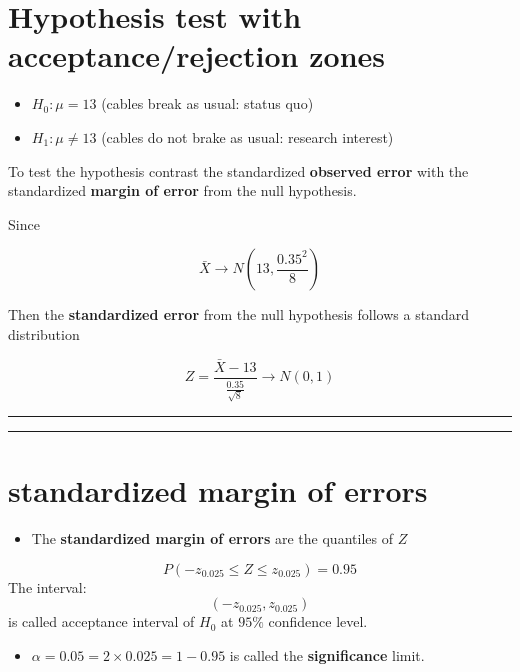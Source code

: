 \documentclass[
]{book}
\providecommand{\tightlist}{%
  \setlength{\itemsep}{0pt}\setlength{\parskip}{0pt}}
\begin{document}
\hypertarget{hypothesis-test-with-acceptancerejection-zones}{%
\section{Hypothesis test with acceptance/rejection zones}\label{hypothesis-test-with-acceptancerejection-zones}}

\begin{itemize}
\tightlist
\item
  \(H_0:\mu = 13\) (cables break as usual: status quo)
\item
  \(H_1:\mu \neq 13\) (cables do not brake as usual: research interest)
\end{itemize}

To test the hypothesis contrast the standardized \textbf{observed error} with the standardized \textbf{margin of error} from the null hypothesis.

Since

\[\bar{X} \rightarrow N(13, \frac{0.35^2}{8})\]

Then the \textbf{standardized error} from the null hypothesis follows a standard distribution

\[Z=\frac{\bar{X}-13}{\frac{0.35}{\sqrt{8}}}  \rightarrow N(0,1)\]

\begin{center}\rule{0.5\linewidth}{0.5pt}\end{center}

\begin{center}\rule{0.5\linewidth}{0.5pt}\end{center}

\hypertarget{standardized-margin-of-errors}{%
\section{standardized margin of errors}\label{standardized-margin-of-errors}}

\begin{itemize}
\tightlist
\item
  The \textbf{standardized margin of errors} are the quantiles of \(Z\)
\end{itemize}

\[P(-z_{0.025} \leq Z \leq z_{0.025})=0.95\]
The interval: \[(-z_{0.025}, z_{0.025})\] is called acceptance interval of \(H_0\) at \(95\%\) confidence level.

\begin{itemize}
\tightlist
\item
  \(\alpha=0.05=2\times 0.025=1-0.95\) is called the \textbf{significance} limit.
\end{itemize}
\end{document}
